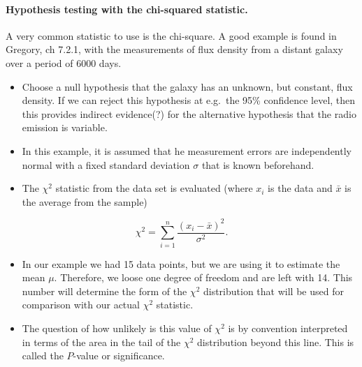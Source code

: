 \documentclass[%
oneside,                 %
final,                   %
10pt]{article}
\begin{document}
\noindent

\paragraph{Hypothesis testing with the chi-squared statistic.}
A very common statistic to use is the chi-square. A good example is found in Gregory, ch 7.2.1, with the measurements of flux density from a distant galaxy over a period of 6000 days.

\begin{itemize}
\item Choose a null hypothesis that the galaxy has an unknown, but constant, flux density. If we can reject this hypothesis at e.g.~the 95\% confidence level, then this provides indirect evidence(?) for the alternative hypothesis that the radio emission is variable.

\item In this example, it is assumed that he measurement errors are independently normal with a fixed standard deviation $\sigma$ that is known beforehand.

\item The $\chi^2$ statistic from the data set is evaluated (where $x_i$ is the data and $\bar{x}$ is the average from the sample)
\end{itemize}

\noindent
\[
\chi^2 = \sum_{i=1}^n \frac{(x_i - \bar{x})^2}{\sigma^2}.
\]

\begin{itemize}
\item In our example we had 15 data points, but we are using it to estimate the mean $\mu$. Therefore, we loose one degree of freedom and are left with 14. This number will determine the form of the $\chi^2$ distribution that will be used for comparison with our actual $\chi^2$ statistic.

\item The question of how unlikely is this value of $\chi^2$ is by convention interpreted in terms of the area in the tail of the $\chi^2$ distribution beyond this line. This is called the $P$-value or significance.
\end{itemize}

\noindent
\end{document}
